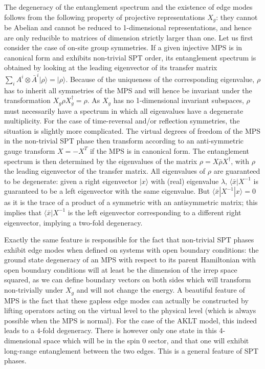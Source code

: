 \documentclass[rmp,aps,reprint,superscriptaddress,nobalancelastpage]{revtex4-1}
\begin{document}
The degeneracy of the entanglement spectrum and the existence of edge modes follows from the following  property of projective representations $X_g$:  they cannot be Abelian and cannot be reduced to 1-dimensional representations,  and hence are only reducible to matrices of dimension strictly larger than one. Let us first consider the case of on-site group symmetries. If a given injective MPS is in  canonical form and exhibits non-trivial SPT order, its entanglement spectrum is obtained by looking at the leading eigenvector of its transfer matrix $\sum_i A^i\otimes \bar{A}^i|\rho\rangle=|\rho\rangle$. Because of the uniqueness of the corresponding eigenvalue, $\rho$ has to inherit all symmetries of the MPS and will hence be invariant under the transformation $X_g\rho X_g^\dagger=\rho$. As $X_g$  has no 1-dimensional invariant subspaces, $\rho$ must necessarily have a spectrum in which all eigenvalues have a degenerate multiplicity. For the case of time-reversal and/or reflection symmetries, the situation is slightly more complicated. The virtual degrees of freedom of the MPS in the non-trivial SPT phase then transform according to an anti-symmetric gauge transform $X=-X^T$ if the MPS is in canonical form. The entanglement spectrum is then determined by the eigenvalues of the matrix $\rho=X\bar{\rho}X^\dagger$, with $\rho$ the leading eigenvector of the transfer matrix. All eigenvalues of $\rho$ are guaranteed to be degenerate: given a right eigenvector $|x\rangle$ with (real) eigenvalue $\lambda$, $\langle\bar{x}|X^{-1}$ is guaranteed to be a left eigenvector with the same eigenvalue. But $\langle\bar{x}|X^{-1}|x\rangle=0$  as it is the trace of a product of a symmetric with an antisymmetric matrix; this implies that $\langle\bar{x}|X^{-1}$ is the left eigenvector corresponding to a different right eigenvector, implying a two-fold degeneracy.


Exactly the same feature is responsible for the fact that non-trivial SPT phases exhibit edge modes when defined on systems with open boundary conditions: the ground state degeneracy of an MPS with respect to its parent Hamiltonian with open boundary conditions will at least be the dimension of the irrep space squared, as we can define boundary vectors on both sides which will transform non-trivially under $X_g$ and will not change the energy. A beautiful feature of MPS is the fact that these gapless edge modes can actually be constructed by lifting operators acting on the virtual level to the physical level (which is always possible when the MPS is normal). For the case of the AKLT model, this indeed leads to a $4$-fold degeneracy. There is however only one state in this 4-dimensional space which will be in the spin $0$ sector, and that one will exhibit long-range entanglement between the two edges. This is a general feature of SPT phases.
\end{document}
